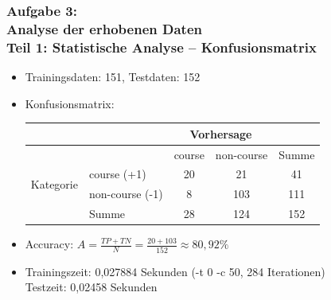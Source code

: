 \documentclass[accentcolor=tud7b,noresetcounter]{tudbeamer}
\begin{document}
	\begin{frame}
		\frametitle{Aufgabe 3:\\ Analyse der erhobenen Daten\\ Teil 1: Statistische Analyse -- Konfusionsmatrix}
		\begin{itemize}
			\item Trainingsdaten: 151, Testdaten: 152
			\item Konfusionsmatrix: \\
			\begin{tabular}{|l|l|c|c||c|}
		\hline
			& & \multicolumn{2}{c|}{Vorhersage} & \\
			\hline
			& & course & non-course & Summe \\
			\hline
		\multirow{2}{*}{Kategorie} & course (+1) & 20 & 21 & 41\\
		\cline{2-5}
		& non-course (-1) & 8 & 103 & 111\\
		\hline
		& Summe & 28 & 124 & 152 \\
		\hline
		\end{tabular}
			\item Accuracy: $A = \frac{TP + TN}{N} = \frac{20+103}{152} \approx 80,92\%$
			\item Trainingszeit: 0,027884 Sekunden (-t 0 -c 50, 284 Iterationen)\\
				Testzeit: 0,02458 Sekunden
		\end{itemize}

		

	\end{frame}
	
	\newcommand{\plotOf}[3]{
 \resizebox {0.9\columnwidth} {!} {
	  \begin{tikzpicture}
	  
	    \begin{axis}[
	    axis lines=middle,
	    axis line style={->},
	    x label style={at={(axis description cs:0.5,-0.1)},anchor=north},
	    y label style={at={(axis description cs:-0.1,.5)},rotate=90,anchor=south},
	    xlabel={#1},
	    ylabel={#2},
	    ]
	    \addplot table [x=features, y=#3,col sep=semicolon]
	    {../Aufg03/3.3result.csv};
	  \end{axis}
	  \end{tikzpicture}
	  }
}
	
\end{document}
